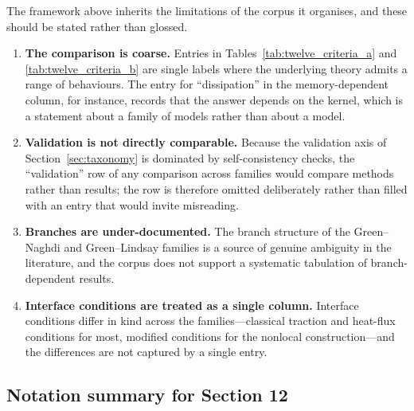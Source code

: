 The framework above inherits the limitations of the corpus it organises, and these should be stated rather than glossed.

\begin{enumerate}
\item \textbf{The comparison is coarse.} Entries in Tables~\ref{tab:twelve_criteria_a} and \ref{tab:twelve_criteria_b} are single labels where the underlying theory admits a range of behaviours. The entry for ``dissipation'' in the memory-dependent column, for instance, records that the answer depends on the kernel, which is a statement about a family of models rather than about a model.
\item \textbf{Validation is not directly comparable.} Because the validation axis of Section~\ref{sec:taxonomy} is dominated by self-consistency checks, the ``validation'' row of any comparison across families would compare methods rather than results; the row is therefore omitted deliberately rather than filled with an entry that would invite misreading.
\item \textbf{Branches are under-documented.} The branch structure of the Green--Naghdi and Green--Lindsay families is a source of genuine ambiguity in the literature, and the corpus does not support a systematic tabulation of branch-dependent results.
\item \textbf{Interface conditions are treated as a single column.} Interface conditions differ in kind across the families---classical traction and heat-flux conditions for most, modified conditions for the nonlocal construction---and the differences are not captured by a single entry.
\end{enumerate}

\subsection{Notation summary for Section 12}

